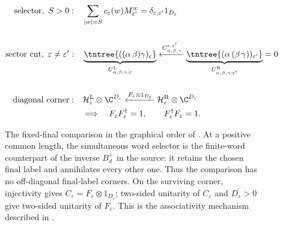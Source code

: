 \begin{figure}[ht]
    \centering
    \begin{align}
        \textup{selector},\ S>0:\quad                          &
        \sum_{|w|=S}c_{\varepsilon}(w)M_{\varepsilon'}^{w}
        =\delta_{\varepsilon,\varepsilon'}1_{D_\varepsilon}
        \notag                                                                        \\[1.5em]
        \textup{sector cut},\ \varepsilon\ne\varepsilon':\quad &
        \underbrace{
            \tntree{((\alpha\,\beta) \gamma)_\varepsilon}
        }_{U^{\mathrm L}_{\alpha,\beta,\gamma;\varepsilon}}
        \xleftarrow{
            C^{\varepsilon,\varepsilon'}_{\alpha,\beta,\gamma}}
        \underbrace{
            \tntree{(\alpha\,(\beta\,\gamma))_{\varepsilon'}}
        }_{U^{\mathrm R}_{\alpha,\beta,\gamma;\varepsilon'}}
        =0
        \notag                                                                        \\[1.5em]
        \textup{diagonal corner}:\quad                         &
        \mathcal H^{\mathrm L}_{\varepsilon}
        \otimes\C^{D_\varepsilon}
        \xleftarrow{F_\varepsilon\otimes1_{D_\varepsilon}}
        \mathcal H^{\mathrm R}_{\varepsilon}
        \otimes\C^{D_\varepsilon}
        \notag                                                                        \\
                                                               & \Longrightarrow\quad
        F_\varepsilon F_\varepsilon^\dagger=1,
        \qquad
        F_\varepsilon^\dagger F_\varepsilon=1.
        \notag
    \end{align}
    \caption{The fixed-final comparison in the graphical order of
        \cite[equation~(pentagon3) and lines~269--277]
        {Bultinck2017Anyons}. At a positive common length, the simultaneous
        word selector is the finite-word counterpart of the inverse
        $B_d^+$ in the source: it retains the chosen final label and
        annihilates every other one. Thus the comparison has no
        off-diagonal final-label corners. On the surviving corner,
        injectivity gives
        $C_\varepsilon=F_\varepsilon\otimes1_{D_\varepsilon}$; two-sided
        unitarity of $C_\varepsilon$ and $D_\varepsilon>0$ give two-sided
        unitarity of $F_\varepsilon$. This is the associativity mechanism
        described in \cite[lines~995--1010]{Cirac2016MPDO_arXiv}.}
    \label{fig:mpdo_fixed_final_comparison_unitary}
\end{figure}
